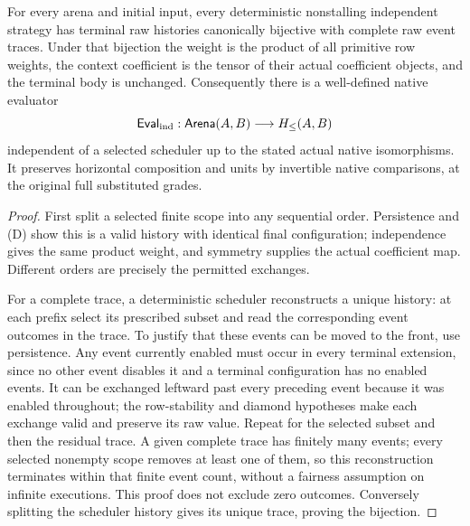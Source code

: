 \documentclass[11pt]{article}
\begin{document}
\begin{theorem}
For every arena and initial input, every deterministic nonstalling independent strategy has terminal raw histories canonically bijective with complete raw event traces. Under that bijection the weight is the product of all primitive row weights, the context coefficient is the tensor of their actual coefficient objects, and the terminal body is unchanged. Consequently there is a well-defined native evaluator
\[
 \mathsf{Eval}_{\rm ind}:\mathsf{Arena}(A,B)\longrightarrow H_{\leq}(A,B)
\]
independent of a selected scheduler up to the stated actual native isomorphisms. It preserves horizontal composition and units by invertible native comparisons, at the original full substituted grades.
\end{theorem}
\begin{proof}
First split a selected finite scope into any sequential order. Persistence and (D) show this is a valid history with identical final configuration; independence gives the same product weight, and symmetry supplies the actual coefficient map. Different orders are precisely the permitted exchanges.

For a complete trace, a deterministic scheduler reconstructs a unique history: at each prefix select its prescribed subset and read the corresponding event outcomes in the trace. To justify that these events can be moved to the front, use persistence. Any event currently enabled must occur in every terminal extension, since no other event disables it and a terminal configuration has no enabled events. It can be exchanged leftward past every preceding event because it was enabled throughout; the row-stability and diamond hypotheses make each exchange valid and preserve its raw value. Repeat for the selected subset and then the residual trace. A given complete trace has finitely many events; every selected nonempty scope removes at least one of them, so this reconstruction terminates within that finite event count, without a fairness assumption on infinite executions. This proof does not exclude zero outcomes. Conversely splitting the scheduler history gives its unique trace, proving the bijection.


\end{proof}
\end{document}
